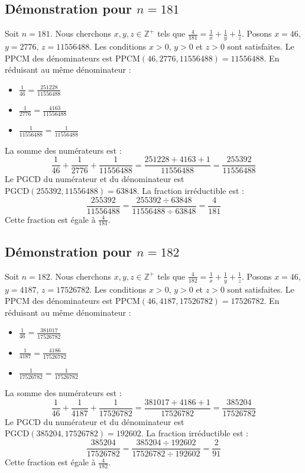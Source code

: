 \documentclass[11pt,a4paper]{article}
\begin{document}
\subsection{Démonstration pour $n = 181$}
Soit $n = 181$. Nous cherchons $x, y, z \in \mathbb{Z}^{+}$ tels que $\frac{4}{181} = \frac{1}{x} + \frac{1}{y} + \frac{1}{z}$.
Posons $x = 46$, $y = 2776$, $z = 11556488$.
Les conditions $x > 0$, $y > 0$ et $z > 0$ sont satisfaites.
Le PPCM des dénominateurs est $\text{PPCM}(46, 2776, 11556488) = 11556488$.
En réduisant au même dénominateur :
\begin{itemize}
    \item $\frac{1}{46} = \frac{251228}{11556488}$
    \item $\frac{1}{2776} = \frac{4163}{11556488}$
    \item $\frac{1}{11556488} = \frac{1}{11556488}$
\end{itemize}
La somme des numérateurs est :
$$ \frac{1}{46} + \frac{1}{2776} + \frac{1}{11556488} = \frac{251228 + 4163 + 1}{11556488} = \frac{255392}{11556488} $$
Le PGCD du numérateur et du dénominateur est $\text{PGCD}(255392, 11556488) = 63848$.
La fraction irréductible est :
$$ \frac{255392}{11556488} = \frac{255392 \div 63848}{11556488 \div 63848} = \frac{4}{181} $$
Cette fraction est égale à $\frac{4}{181}$.

\subsection{Démonstration pour $n = 182$}
Soit $n = 182$. Nous cherchons $x, y, z \in \mathbb{Z}^{+}$ tels que $\frac{4}{182} = \frac{1}{x} + \frac{1}{y} + \frac{1}{z}$.
Posons $x = 46$, $y = 4187$, $z = 17526782$.
Les conditions $x > 0$, $y > 0$ et $z > 0$ sont satisfaites.
Le PPCM des dénominateurs est $\text{PPCM}(46, 4187, 17526782) = 17526782$.
En réduisant au même dénominateur :
\begin{itemize}
    \item $\frac{1}{46} = \frac{381017}{17526782}$
    \item $\frac{1}{4187} = \frac{4186}{17526782}$
    \item $\frac{1}{17526782} = \frac{1}{17526782}$
\end{itemize}
La somme des numérateurs est :
$$ \frac{1}{46} + \frac{1}{4187} + \frac{1}{17526782} = \frac{381017 + 4186 + 1}{17526782} = \frac{385204}{17526782} $$
Le PGCD du numérateur et du dénominateur est $\text{PGCD}(385204, 17526782) = 192602$.
La fraction irréductible est :
$$ \frac{385204}{17526782} = \frac{385204 \div 192602}{17526782 \div 192602} = \frac{2}{91} $$
Cette fraction est égale à $\frac{4}{182}$.
\end{document}
